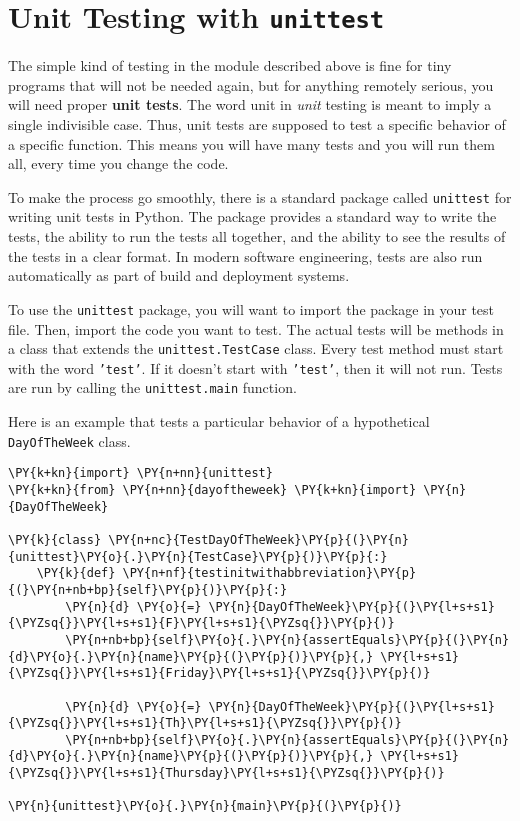 \section{Unit Testing with \texttt{unittest}}


The simple kind of testing in the module described above is fine for tiny programs that will not be needed again, but for anything remotely serious, you will need proper \textbf{unit tests}.  The word unit in \emph{unit} testing is meant to imply a single indivisible case.  Thus, unit tests are supposed to test a specific behavior of a specific function.  This means you will have many tests and you will run them all, every time you change the code.  


To make the process go smoothly, there is a standard package  called \texttt{unittest} for writing unit tests in Python.  The package provides a standard way to write the tests, the ability to run the tests all together, and the ability to see the results of the tests in a clear format.  In modern software engineering, tests are also run automatically as part of build and deployment systems.


To use the \texttt{unittest} package, you will want to import the package in your test file.
Then, import the code you want to test.
The actual tests will be methods in a class that extends the \texttt{unittest.TestCase} class.
Every test method must start with the word \texttt{'test'}.  If it doesn’t start with \texttt{'test'}, then it will not run.
Tests are run by calling the \texttt{unittest.main} function.


Here is an example that tests a particular behavior of a hypothetical \texttt{DayOfTheWeek} class.

\begin{Verbatim}[commandchars=\\\{\}]
\PY{k+kn}{import} \PY{n+nn}{unittest}
\PY{k+kn}{from} \PY{n+nn}{dayoftheweek} \PY{k+kn}{import} \PY{n}{DayOfTheWeek}

\PY{k}{class} \PY{n+nc}{TestDayOfTheWeek}\PY{p}{(}\PY{n}{unittest}\PY{o}{.}\PY{n}{TestCase}\PY{p}{)}\PY{p}{:}
    \PY{k}{def} \PY{n+nf}{testinitwithabbreviation}\PY{p}{(}\PY{n+nb+bp}{self}\PY{p}{)}\PY{p}{:}
        \PY{n}{d} \PY{o}{=} \PY{n}{DayOfTheWeek}\PY{p}{(}\PY{l+s+s1}{\PYZsq{}}\PY{l+s+s1}{F}\PY{l+s+s1}{\PYZsq{}}\PY{p}{)}
        \PY{n+nb+bp}{self}\PY{o}{.}\PY{n}{assertEquals}\PY{p}{(}\PY{n}{d}\PY{o}{.}\PY{n}{name}\PY{p}{(}\PY{p}{)}\PY{p}{,} \PY{l+s+s1}{\PYZsq{}}\PY{l+s+s1}{Friday}\PY{l+s+s1}{\PYZsq{}}\PY{p}{)}

        \PY{n}{d} \PY{o}{=} \PY{n}{DayOfTheWeek}\PY{p}{(}\PY{l+s+s1}{\PYZsq{}}\PY{l+s+s1}{Th}\PY{l+s+s1}{\PYZsq{}}\PY{p}{)}
        \PY{n+nb+bp}{self}\PY{o}{.}\PY{n}{assertEquals}\PY{p}{(}\PY{n}{d}\PY{o}{.}\PY{n}{name}\PY{p}{(}\PY{p}{)}\PY{p}{,} \PY{l+s+s1}{\PYZsq{}}\PY{l+s+s1}{Thursday}\PY{l+s+s1}{\PYZsq{}}\PY{p}{)}     

\PY{n}{unittest}\PY{o}{.}\PY{n}{main}\PY{p}{(}\PY{p}{)}
\end{Verbatim}



